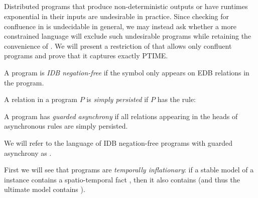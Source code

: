 \subsection{\large \bf \slang}

Distributed programs that produce non-deterministic outputs or have runtimes
exponential in their inputs are undesirable in practice. Since checking for
confluence in \lang is undecidable in general, we may instead ask whether a more
constrained language will exclude such undesirable programs while retaining the
convenience of \lang.  We will present a restriction of \lang that allows only
confluent programs and prove that it captures exactly PTIME.

\begin{definition}
A \lang program is {\em IDB negation-free} if the \dedalus{!} symbol only appears on EDB relations in the program.
\end{definition}

\begin{definition}
A relation  in a \lang program $P$ is {\em simply persisted} if $P$ has the rule: 
\end{definition}

\begin{definition}
A \lang program has {\em guarded asynchrony} if all relations appearing in the heads of asynchronous rules are simply persisted.
\end{definition}

We will refer to the language of IDB negation-free \lang programs with guarded
asynchrony as \slang.

First we will see that \slang programs are {\em temporally inflationary}: if a stable model
of a \slang instance contains a spatio-temporal fact , then it also
contains  (and thus the ultimate model contains ).

